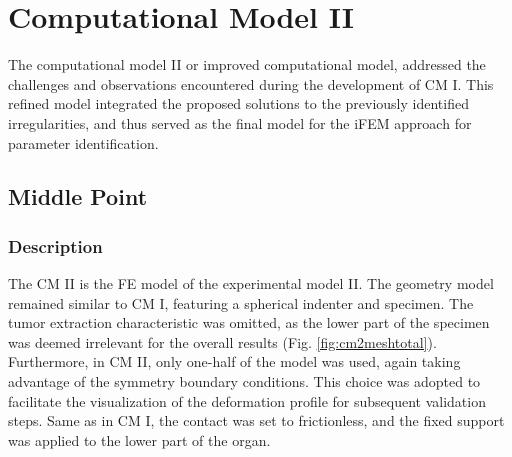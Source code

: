 \section{Computational Model II}
\label{section:cmII}
The computational model II or improved computational model, addressed the challenges and observations 
encountered during the development of CM I. This refined model integrated the proposed
solutions to the previously identified irregularities, and thus served as the final model for the 
iFEM approach for parameter identification. 

\subsection{Middle Point}
\label{subsection:mpcmII}
\subsubsection*{Description}
The CM II is the FE model of the experimental model II. The geometry model remained similar to CM I,
featuring a spherical indenter and specimen. The tumor extraction characteristic was omitted, as the 
lower part of the specimen was deemed irrelevant for the overall results (Fig. \ref{fig:cm2meshtotal}). Furthermore, in CM II, only 
one-half of the model was used, again taking advantage of the symmetry boundary conditions. This choice was adopted to facilitate the visualization of the deformation profile for subsequent validation 
steps. Same as in CM I, the contact was set to frictionless, and the fixed support was applied to the lower part of the organ.\\

